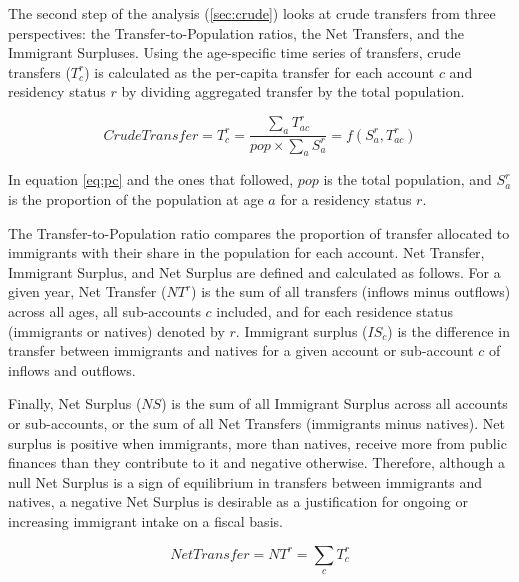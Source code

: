 \vspace{0.7em}\par
The second step of the analysis (\autoref{sec:crude}) looks at crude transfers from three perspectives: the Transfer-to-Population ratios, the Net Transfers, and the Immigrant Surpluses.
Using the age-specific time series of transfers, crude transfers (\(T^{r}_c \)) is calculated as the per-capita transfer for each account \(c \) and residency status \(r\) by dividing aggregated transfer by the total population.

\begin{equation}\label{eq:pc}
  Crude Transfer=T^{r}_c= \frac{\displaystyle\sum_{a}T^{r}_{ac} }{ pop \times \displaystyle\sum_{a} S^{r}_a}=f(S^{r}_a, T^{r}_{ac})
\end{equation}

In equation \eqref{eq:pc} and the ones that followed, \(pop\) is the total population, and \(S^{r}_a\) is the proportion of the population at age \(a\) for a residency status \(r\).

\vspace{0.7em}\par
The Transfer-to-Population ratio compares the proportion of transfer allocated to immigrants with their share in the population for each account.
Net Transfer, Immigrant Surplus, and Net Surplus are defined and calculated as follows.
For a given year, Net Transfer (\(NT^{r}\)) is the sum of all transfers (inflows minus outflows) across all ages, all sub-accounts \(c \) included, and for each residence status (immigrants or natives) denoted by \(r \).
Immigrant surplus (\(IS_{c}\)) is the difference in transfer between immigrants and natives for a given account or sub-account \(c \) of inflows and outflows.

\vspace{0.7em}\par
Finally, Net Surplus (\( NS \)) is the sum of all Immigrant Surplus across all accounts or sub-accounts, or the sum of all Net Transfers (immigrants minus natives).
Net surplus is positive when immigrants, more than natives, receive more from public finances than they contribute to it and negative otherwise.
Therefore, although a null Net Surplus is a sign of equilibrium in transfers between immigrants and natives, a negative Net Surplus is desirable as a justification for ongoing or increasing immigrant intake on a fiscal basis.

\begin{equation}\label{eq:nt}
  Net Transfer=NT^{r}= \displaystyle\sum_{c}T^{r}_{c}
\end{equation}

